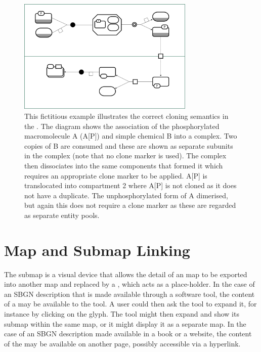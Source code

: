 \begin{figure}[htb]
  \centering
  \includegraphics[width=0.75\textwidth]{images/cloningrules-eg}
  \caption{This fictitious example illustrates the correct cloning semantics in
    the \PDl. The diagram shows the association of the phosphorylated
    macromolecule A (A[P]) and simple chemical B into a complex. Two
    copies of B are consumed and these are shown as separate subunits
    in the complex (note that no clone marker is used). The complex
    then dissociates into the same components that formed it which
    requires an appropriate clone marker to be applied. A[P] is
    translocated into compartment 2 where A[P] is not cloned as it
    does not have a duplicate. The unphosphorylated form of A
    dimerised, but again this does not require a clone marker as these
    are regarded as separate entity pools.}
  \label{fig:techref:cloningrules-eg}
\end{figure}

\section{Map and Submap Linking}
\label{sec:techref:mapsubmaps}
\label{sec:techref:submaplinkingsemantics}

The submap is a visual device that allows the detail of an \PD map to
be exported into another \PD map and replaced by a
, which acts as a place-holder. In the case of an
SBGN description that is made available through a software tool, the
content of a  may be available to the tool.  A
user could then ask the tool to expand it, for instance by clicking on
the  glyph.  The tool might then expand and show
its submap within the same map, or it might display it as a separate
map. In the case of an SBGN description made available in a book or a
website, the content of the  may be available on another
page, possibly accessible via a hyperlink.

